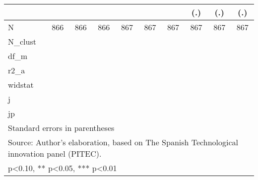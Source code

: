 \begin{table}[htbp]
\begin{tabular}{l*{9}{c}}
                    &               &               &               &               &               &               &         (.)   &         (.)   &         (.)   \\
\hline
N                   &         866   &         866   &         866   &         867   &         867   &         867   &         867   &         867   &         867   \\
N\_clust             &               &               &               &               &               &               &               &               &               \\
df\_m                &               &               &               &               &               &               &               &               &               \\
r2\_a                &               &               &               &               &               &               &               &               &               \\
widstat             &               &               &               &               &               &               &               &               &               \\
j                   &               &               &               &               &               &               &               &               &               \\
jp                  &               &               &               &               &               &               &               &               &               \\
\hline\hline
\multicolumn{10}{l}{\footnotesize Standard errors in parentheses}\\
\multicolumn{10}{l}{\footnotesize Source: Author's elaboration, based on The Spanish Technological innovation panel (PITEC).}\\
\multicolumn{10}{l}{\footnotesize * p<0.10, ** p<0.05, *** p<0.01}\\
\end{tabular}
\end{table}
